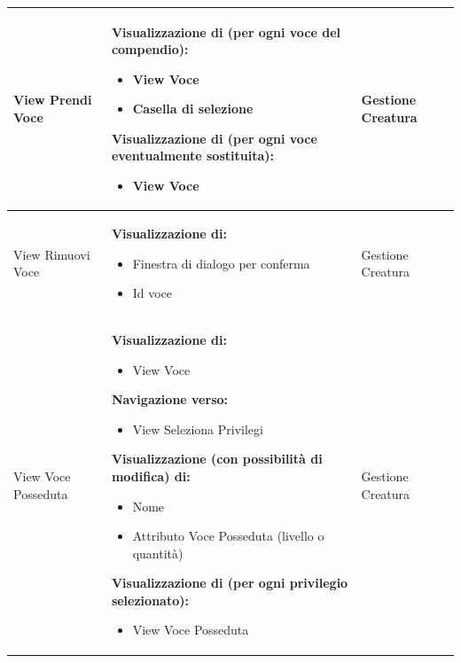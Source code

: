 \documentclass[a4paper, 11pt]{article}
\begin{document}
\begin{adjustwidth}{-1.5cm}{-1.5cm}
\begin{center}
\begin{longtable}{|p{5cm}|p{5cm}|p{5cm}|}
        View Prendi Voce & \textbf{Visualizzazione di (per ogni voce del compendio):}
        \begin{itemize}
            \item View Voce
            \item Casella di selezione
        \end{itemize}
        \textbf{Visualizzazione di (per ogni voce eventualmente sostituita):}
        \begin{itemize}
            \item View Voce
        \end{itemize} & Gestione Creatura \\ \hline
        
        View Rimuovi Voce & \textbf{Visualizzazione di:}
        \begin{itemize}
            \item Finestra di dialogo per conferma
            \item Id voce
        \end{itemize} & Gestione Creatura \\ \hline
        
        View Voce Posseduta & 
        \textbf{Visualizzazione di:}
        \begin{itemize}
            \item View Voce
        \end{itemize}
        \textbf{Navigazione verso:}
        \begin{itemize}
            \item View Seleziona Privilegi
        \end{itemize}
        \textbf{Visualizzazione (con possibilità di modifica) di:}
        \begin{itemize}
            \item Nome
            \item Attributo Voce Posseduta (livello o quantità)
        \end{itemize}
        \textbf{Visualizzazione di (per ogni privilegio selezionato):}
        \begin{itemize}
            \item View Voce Posseduta
        \end{itemize} & Gestione Creatura \\ \hline
        

\end{longtable}
\end{center}
\end{adjustwidth}
\end{document}
